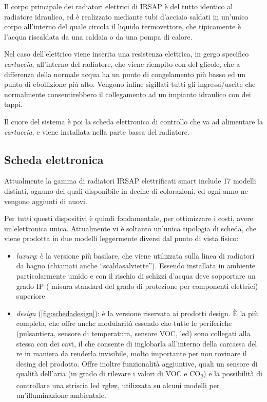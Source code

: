 \documentclass[12pt,a4paper,twoside,titlepage]{book}
\begin{document}
Il corpo principale dei radiatori elettrici di IRSAP è del tutto identico al radiatore idraulico,
ed è realizzato mediante tubi d'acciaio saldati in un'unico corpo all'interno del quale circola 
il liquido termovettore, che tipicamente è l'acqua riscaldata da una caldaia o da una pompa di calore. 

Nel caso dell'elettrico viene inserita una resistenza elettrica, in gergo specifico \textit{cartuccia},
all'interno del radiatore, che viene riempito con del glicole, che a differenza della normale acqua 
ha un punto di congelamento più basso ed un punto di ebollizione più alto. Vengono infine sigillati 
tutti gli ingressi/uscite che normalmente consentirebbero il collegamento ad un impianto idraulico con dei tappi. 

Il cuore del sistema è poi la scheda elettronica di controllo che va ad alimentare la \textit{cartuccia},
e viene installata nella parte bassa del radiatore. 

\subsection{Scheda elettronica}

Attualmente la gamma di radiatori IRSAP elettrificati smart include 17 modelli distinti, 
ognuno dei quali disponibile in decine di colorazioni, ed ogni anno ne vengono aggiunti di nuovi. 

Per tutti questi dispositivi è quindi fondamentale, per ottimizzare i costi, avere un'elettronica 
unica. Attualmente vi è soltanto un'unica tipologia di scheda, che viene prodotta in due modelli 
leggermente diversi dal punto di vista fisico:

\begin{itemize}
    \item \textit{luxury}: è la versione più basilare, che viene utilizzata sulla linea di
        radiatori da bagno (chiamati anche ``scaldasalviette''). Essendo installata in ambiente 
        particolarmente umido e con il rischio di schizzi d'acqua deve sopportare un grado IP (
        misura standard del grado di protezione per componenti elettrici) superiore
    \item \textit{design} (\autoref{fig:schedadesign}): è la versione riservata ai prodotti design. È la più completa,
        che offre anche modularità essendo che tutte le periferiche (pulsantiera, sensore di temperatura,
        sensore VOC, \acrshort{led}) sono collegati alla stessa con dei cavi, il che consente di inglobarla
        all'interno della carcassa del \acrshort{re} in maniera da renderla invisibile, molto importante per non rovinare 
        il desing del prodotto. Offre inoltre funzionalità aggiuntive, quali un sensore di qualità
        dell'aria (in grado di rilevare i valori di VOC e CO\textsubscript{2}) e la possibilità di
        controllare una striscia \acrshort{led} \Gls{rgbw}, utilizzata su alcuni modelli per un'illuminazione ambientale.
\end{itemize}
\end{document}
